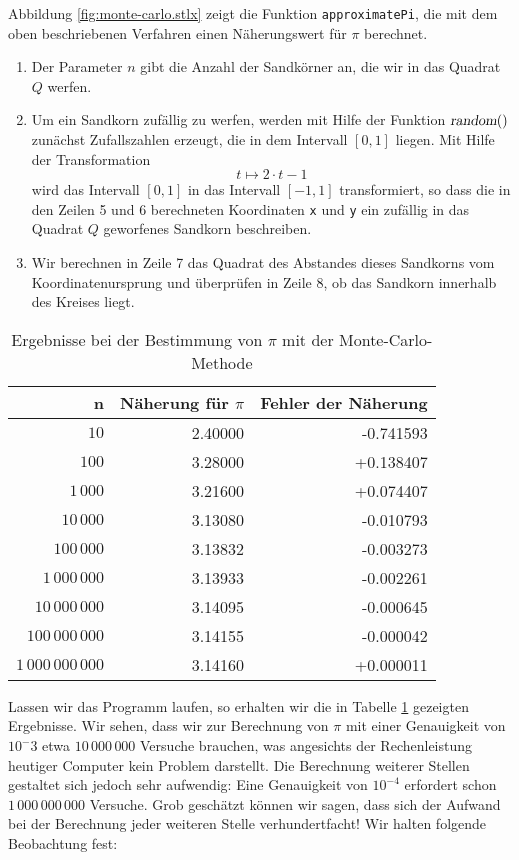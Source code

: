 Abbildung \ref{fig:monte-carlo.stlx} zeigt die Funktion \texttt{approximatePi}, die mit dem oben
beschriebenen Verfahren einen N\"aherungswert f\"ur $\pi$ berechnet.
\begin{enumerate}
\item Der Parameter $n$ gibt die Anzahl der Sandk\"orner an, die wir in das Quadrat $Q$ werfen.
\item Um ein Sandkorn zuf\"allig zu werfen, werden mit Hilfe der Funktion $\textsl{random}()$ 
      zun\"achst Zufalls\-zahlen erzeugt, die in dem
      Intervall $[0,1]$ liegen.  Mit Hilfe der Transformation 
      \[ t \mapsto 2 \cdot t - 1  \]
      wird das Intervall $[0,1]$ in das Intervall $[-1, 1]$ transformiert, so dass die in den Zeilen 5 und 6
      berechneten Koordinaten \texttt{x} und \texttt{y} ein zuf\"allig in das Quadrat $Q$ 
      geworfenes Sandkorn beschreiben.
\item Wir berechnen in Zeile 7 das Quadrat des  Abstandes dieses Sandkorns vom
      Koordinatenursprung und \"uberpr\"ufen in Zeile 8, ob das Sandkorn innerhalb des Kreises liegt.
\end{enumerate}

\begin{table}[htbp]
  \label{tab:pi}
  \centering
  \begin{tabular}[t]{|r|r|r|}
  \hline
  n & N\"aherung f\"ur $\pi$ & Fehler der N\"aherung \\
  \hline
  \hline
               $10$ & 2.40000 & -0.741593 \\
\hline
              $100$ & 3.28000 & +0.138407 \\
\hline
           $1\,000$ & 3.21600 & +0.074407 \\
\hline
          $10\,000$ & 3.13080 & -0.010793 \\
\hline
         $100\,000$ & 3.13832 & -0.003273 \\
\hline
      $1\,000\,000$ & 3.13933 & -0.002261 \\
\hline
     $10\,000\,000$ & 3.14095 & -0.000645 \\
\hline
    $100\,000\,000$ & 3.14155 & -0.000042 \\
\hline
 $1\,000\,000\,000$ & 3.14160 & +0.000011 \\
\hline
  \end{tabular}
  \caption{Ergebnisse bei der Bestimmung von $\pi$ mit der Monte-Carlo-Methode}
\end{table}

Lassen wir das Programm laufen, so erhalten wir die in Tabelle \ref{tab:pi} gezeigten Ergebnisse.
Wir sehen, dass wir zur Berechnung von $\pi$ mit einer Genauigkeit von $10^-{3}$ etwa $10\,000\,000$
Versuche brauchen, was angesichts der Rechenleistung heutiger Computer kein Problem darstellt.  Die Berechnung
weiterer Stellen gestaltet sich jedoch sehr aufwendig:  Eine Genauigkeit von $10^{-4}$
erfordert schon $1\,000\,000\,000$ Versuche. Grob gesch\"atzt k\"onnen wir
sagen, dass sich der Aufwand bei der Berechnung jeder weiteren Stelle verhundertfacht!  
Wir halten folgende Beobachtung fest:

